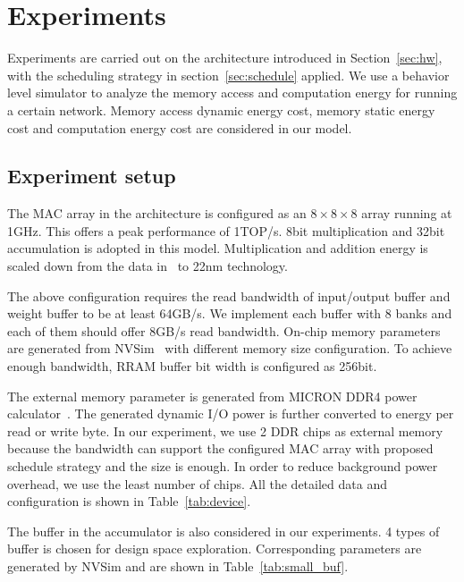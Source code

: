 \section{Experiments}\label{sec:exp}



Experiments are carried out on the architecture introduced in Section~\ref{sec:hw}, with the scheduling strategy in section~\ref{sec:schedule} applied. We use a behavior level simulator to analyze the memory access and computation energy for running a certain network. Memory access dynamic energy cost, memory static energy cost and computation energy cost are considered in our model.

\subsection{Experiment setup}
The MAC array in the architecture is configured as an $8\times8\times8$ array running at 1GHz. This offers a peak performance of 1TOP/s. 8bit multiplication and 32bit accumulation is adopted in this model. Multiplication and addition energy is scaled down from the data in~\cite{mac_energy} to 22nm technology. 

The above configuration requires the read bandwidth of input/output buffer and weight buffer to be at least 64GB/s. We implement each buffer with 8 banks and each of them should offer 8GB/s read bandwidth. On-chip memory parameters are generated from NVSim~\cite{dong2014nvsim} with different memory size configuration. To achieve enough bandwidth, RRAM buffer bit width is configured as 256bit. 

The external memory parameter is generated from MICRON DDR4 power calculator~\cite{powercalc}. The generated dynamic I/O power is further converted to energy per read or write byte. In our experiment, we use 2 DDR chips as external memory because the bandwidth can support the configured MAC array with proposed schedule strategy and the size is enough. In order to reduce background power overhead, we use the least number of chips. All the detailed data and configuration is shown in Table~\ref{tab:device}. 

The buffer in the accumulator is also considered in our experiments. 4 types of buffer is chosen for design space exploration. Corresponding parameters are generated by NVSim and are shown in Table~\ref{tab:small_buf}.



